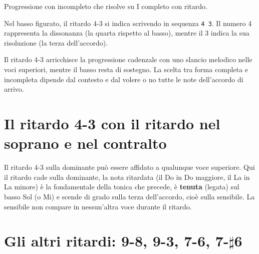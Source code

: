 \begin{esempio}
	\label{ex:ritardo_incompleto_minore}
	Progressione con  incompleto che risolve su I completo con ritardo.
	
\end{esempio}

\begin{regola}
	\label{reg:cifratura_ritardo}
	Nel basso figurato, il ritardo 4-3 si indica scrivendo in sequenza \texttt{4 3}. Il numero 4 rappresenta la dissonanza (la quarta rispetto al basso), mentre il 3 indica la sua risoluzione (la terza dell'accordo).
\end{regola}

Il ritardo 4-3 arricchisce la progressione cadenzale con uno slancio melodico nelle voci superiori, mentre il basso resta di sostegno. La scelta tra forma completa e incompleta dipende dal contesto e dal volere o no tutte le note dell'accordo di arrivo.

\section{Il ritardo 4-3 con il ritardo nel soprano e nel contralto}
\label{sec:ritardo_4_3_voci}

Il ritardo 4-3 sulla dominante può essere affidato a qualunque voce superiore. Qui il ritardo cade sulla dominante, la nota ritardata (il Do in Do maggiore, il La in La minore) è la fondamentale della tonica che precede, è \textbf{tenuta} (legata) sul basso Sol (o Mi) e scende di grado sulla terza dell'accordo, cioè sulla sensibile. La sensibile non compare in nessun'altra voce durante il ritardo.

\begin{esempio}
	\label{ex:ritardo_4_3_s}
\end{esempio}

\begin{esempio}
	\label{ex:ritardo_4_3_a}
\end{esempio}

\section{Gli altri ritardi: 9-8, 9-3, 7-6, 7-\texorpdfstring{$\sharp$}{\#}6}
\label{sec:altri_ritardi}

